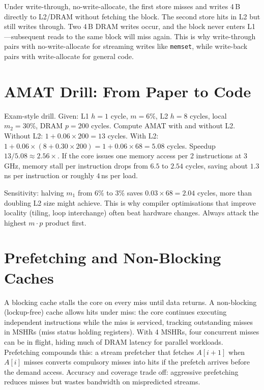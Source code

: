 Under write-through, no-write-allocate, the first store misses and writes 4\,B directly to L2/DRAM without fetching the block. The second store hits in L2 but still writes through. Two 4\,B DRAM writes occur, and the block never enters L1---subsequent reads to the same block will miss again. This is why write-through pairs with no-write-allocate for streaming writes like \texttt{memset}, while write-back pairs with write-allocate for general code.

\section{AMAT Drill: From Paper to Code}
Exam-style drill. Given: L1 $h=1$ cycle, $m=6\%$, L2 $h=8$ cycles, local $m_2=30\%$, DRAM $p=200$ cycles. Compute AMAT with and without L2. Without L2: $1+0.06\times200=13$ cycles. With L2: $1+0.06\times(8+0.30\times200)=1+0.06\times68=5.08$ cycles. Speedup $13/5.08\approx2.56\times$. If the core issues one memory access per 2 instructions at 3\,GHz, memory stall per instruction drops from $6.5$ to $2.54$ cycles, saving about $1.3$\,ns per instruction or roughly $4$\,ns per load.

Sensitivity: halving $m_1$ from 6\% to 3\% saves $0.03\times68=2.04$ cycles, more than doubling L2 size might achieve. This is why compiler optimisations that improve locality (tiling, loop interchange) often beat hardware changes. Always attack the highest $m\cdot p$ product first.
\section{Prefetching and Non-Blocking Caches}
A blocking cache stalls the core on every miss until data returns. A non-blocking (lockup-free) cache allows hits under miss: the core continues executing independent instructions while the miss is serviced, tracking outstanding misses in MSHRs (miss status holding registers). With 4 MSHRs, four concurrent misses can be in flight, hiding much of DRAM latency for parallel workloads. Prefetching compounds this: a stream prefetcher that fetches $A[i+1]$ when $A[i]$ misses converts compulsory misses into hits if the prefetch arrives before the demand access. Accuracy and coverage trade off: aggressive prefetching reduces misses but wastes bandwidth on mispredicted streams.

